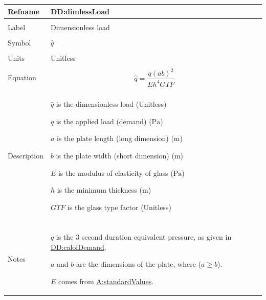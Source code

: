 \documentclass[12pt]{article}
\begin{document}
\vspace{\baselineskip}
\noindent
\begin{minipage}{\textwidth}
\begin{tabular}{>{\raggedright}p{}>{\raggedright\arraybackslash}p{}}
\toprule \textbf{Refname} & \textbf{DD:dimlessLoad}
\label{DD:dimlessLoad}
\\ \midrule \\
Label & Dimensionless load
        
\\ \midrule \\
Symbol & $\hat{q}$
         
\\ \midrule \\
Units & Unitless
        
\\ \midrule \\
Equation & \begin{displaymath}
           \hat{q}=\frac{q \left(a b\right)^{2}}{E h^{4} \mathit{GTF}}
           \end{displaymath}
\\ \midrule \\
Description & \begin{symbDescription}
              \item{$\hat{q}$ is the dimensionless load (Unitless)}
              \item{$q$ is the applied load (demand) (${\text{Pa}}$)}
              \item{$a$ is the plate length (long dimension) (${\text{m}}$)}
              \item{$b$ is the plate width (short dimension) (${\text{m}}$)}
              \item{$E$ is the modulus of elasticity of glass (${\text{Pa}}$)}
              \item{$h$ is the minimum thickness (${\text{m}}$)}
              \item{$\mathit{GTF}$ is the glass type factor (Unitless)}
              \end{symbDescription}
\\ \midrule \\
Notes & $q$ is the 3 second duration equivalent pressure, as given in \hyperref[DD:calofDemand]{DD:calofDemand}.
        
        $a$ and $b$ are the dimensions of the plate, where ($a\geq{}b$).
        
        $E$ comes from \hyperref[assumpSV]{A:standardValues}.
        

\end{tabular}
\end{minipage}
\end{document}
